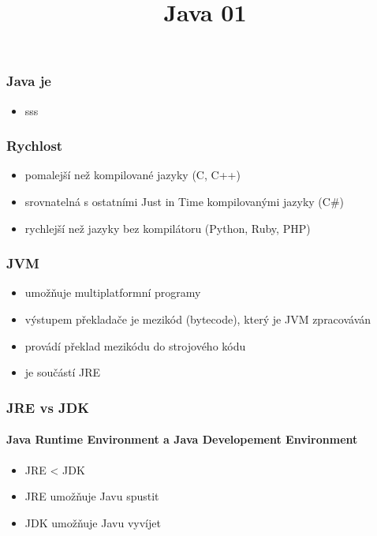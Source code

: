 \documentclass[nologo]{slides}
\title{Java 01}
\author[Lukáš Němec]{%
    \makebox[0.5\textwidth][l]{\textbf{Lukáš Němec}}\\%
    \vskip 1em
    \vskip 1em
}
\begin{document}
\maketitle

\begin{frame}
    \frametitle{Java je}

    \begin{itemize}
        \item sss
    \end{itemize}

\end{frame}

\begin{frame}
    \frametitle{Rychlost}

    \begin{itemize}
        \item pomalejší než kompilované jazyky (C, C++)
        \item srovnatelná s ostatními Just in Time kompilovanými jazyky (C#)
        \item rychlejší než jazyky bez kompilátoru (Python, Ruby, PHP)
    \end{itemize}

\end{frame}

\begin{frame}
    \frametitle{JVM}

    \begin{itemize}
        \item umožňuje multiplatformní programy
        \item výstupem překladače je mezikód (bytecode), který je JVM zpracováván
        \item provádí překlad mezikódu do strojového kódu
        \item je součástí JRE
    \end{itemize}

\end{frame}

\begin{frame}
    \frametitle{JRE vs JDK}
    \framesubtitle{Java Runtime Environment a Java Developement Environment}
    \begin{itemize}
        \item JRE < JDK
        \item JRE umožňuje Javu spustit
        \item JDK umožňuje Javu vyvíjet
    \end{itemize}

\end{frame}
\end{document}
